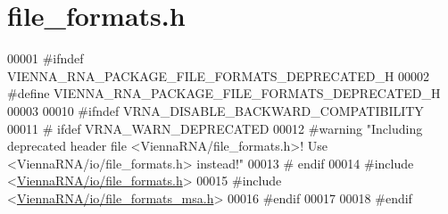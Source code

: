 \hypertarget{file__formats_8h_source}{}\section{file\+\_\+formats.\+h}
\label{file__formats_8h_source}

\begin{DoxyCode}
00001 \textcolor{preprocessor}{#ifndef VIENNA\_RNA\_PACKAGE\_FILE\_FORMATS\_DEPRECATED\_H}
00002 \textcolor{preprocessor}{#define VIENNA\_RNA\_PACKAGE\_FILE\_FORMATS\_DEPRECATED\_H}
00003 
00010 \textcolor{preprocessor}{#ifndef VRNA\_DISABLE\_BACKWARD\_COMPATIBILITY}
00011 \textcolor{preprocessor}{# ifdef VRNA\_WARN\_DEPRECATED}
00012 \textcolor{preprocessor}{#warning "Including deprecated header file <ViennaRNA/file\_formats.h>! Use <ViennaRNA/io/file\_formats.h>
       instead!"}
00013 \textcolor{preprocessor}{# endif}
00014 \textcolor{preprocessor}{#include <\hyperlink{io_2file__formats_8h}{ViennaRNA/io/file\_formats.h}>}
00015 \textcolor{preprocessor}{#include <\hyperlink{io_2file__formats__msa_8h}{ViennaRNA/io/file\_formats\_msa.h}>}
00016 \textcolor{preprocessor}{#endif}
00017 
00018 \textcolor{preprocessor}{#endif}
\end{DoxyCode}
